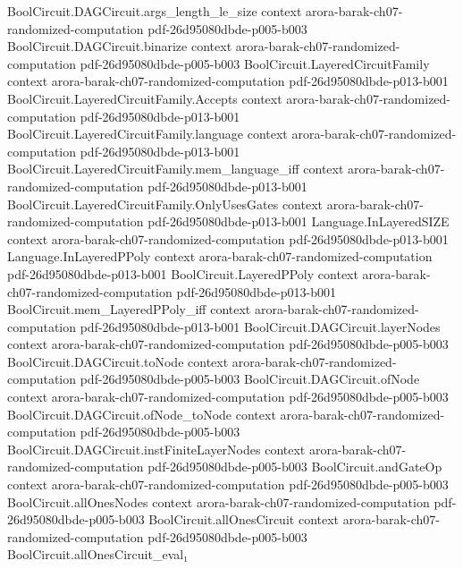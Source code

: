 \begin{theorem}
\proofstep
  {BoolCircuit.DAGCircuit.args_length_le_size}
  {context}
  {arora-barak-ch07-randomized-computation}
  {pdf-26d95080dbde-p005-b003}
\proofstep
  {BoolCircuit.DAGCircuit.binarize}
  {context}
  {arora-barak-ch07-randomized-computation}
  {pdf-26d95080dbde-p005-b003}
\proofstep
  {BoolCircuit.LayeredCircuitFamily}
  {context}
  {arora-barak-ch07-randomized-computation}
  {pdf-26d95080dbde-p013-b001}
\proofstep
  {BoolCircuit.LayeredCircuitFamily.Accepts}
  {context}
  {arora-barak-ch07-randomized-computation}
  {pdf-26d95080dbde-p013-b001}
\proofstep
  {BoolCircuit.LayeredCircuitFamily.language}
  {context}
  {arora-barak-ch07-randomized-computation}
  {pdf-26d95080dbde-p013-b001}
\proofstep
  {BoolCircuit.LayeredCircuitFamily.mem_language_iff}
  {context}
  {arora-barak-ch07-randomized-computation}
  {pdf-26d95080dbde-p013-b001}
\proofstep
  {BoolCircuit.LayeredCircuitFamily.OnlyUsesGates}
  {context}
  {arora-barak-ch07-randomized-computation}
  {pdf-26d95080dbde-p013-b001}
\proofstep
  {Language.InLayeredSIZE}
  {context}
  {arora-barak-ch07-randomized-computation}
  {pdf-26d95080dbde-p013-b001}
\proofstep
  {Language.InLayeredPPoly}
  {context}
  {arora-barak-ch07-randomized-computation}
  {pdf-26d95080dbde-p013-b001}
\proofstep
  {BoolCircuit.LayeredPPoly}
  {context}
  {arora-barak-ch07-randomized-computation}
  {pdf-26d95080dbde-p013-b001}
\proofstep
  {BoolCircuit.mem_LayeredPPoly_iff}
  {context}
  {arora-barak-ch07-randomized-computation}
  {pdf-26d95080dbde-p013-b001}
\proofstep
  {BoolCircuit.DAGCircuit.layerNodes}
  {context}
  {arora-barak-ch07-randomized-computation}
  {pdf-26d95080dbde-p005-b003}
\proofstep
  {BoolCircuit.DAGCircuit.toNode}
  {context}
  {arora-barak-ch07-randomized-computation}
  {pdf-26d95080dbde-p005-b003}
\proofstep
  {BoolCircuit.DAGCircuit.ofNode}
  {context}
  {arora-barak-ch07-randomized-computation}
  {pdf-26d95080dbde-p005-b003}
\proofstep
  {BoolCircuit.DAGCircuit.ofNode_toNode}
  {context}
  {arora-barak-ch07-randomized-computation}
  {pdf-26d95080dbde-p005-b003}
\proofstep
  {BoolCircuit.DAGCircuit.instFiniteLayerNodes}
  {context}
  {arora-barak-ch07-randomized-computation}
  {pdf-26d95080dbde-p005-b003}
\proofstep
  {BoolCircuit.andGateOp}
  {context}
  {arora-barak-ch07-randomized-computation}
  {pdf-26d95080dbde-p005-b003}
\proofstep
  {BoolCircuit.allOnesNodes}
  {context}
  {arora-barak-ch07-randomized-computation}
  {pdf-26d95080dbde-p005-b003}
\proofstep
  {BoolCircuit.allOnesCircuit}
  {context}
  {arora-barak-ch07-randomized-computation}
  {pdf-26d95080dbde-p005-b003}
\proofstep
  {BoolCircuit.allOnesCircuit_eval₁}

\end{theorem}
